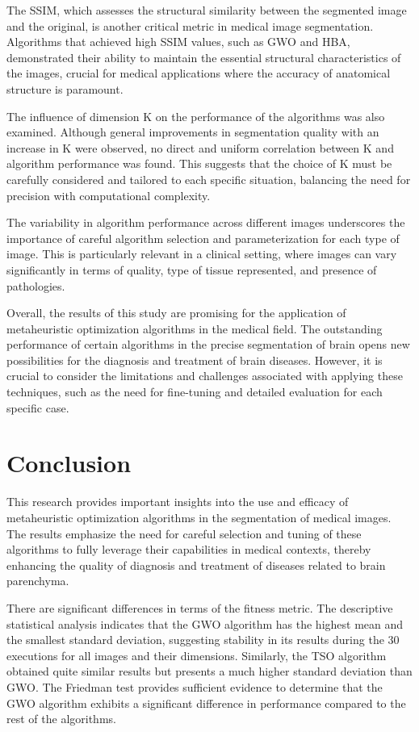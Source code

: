 \documentclass{elsarticle}
\begin{document}
\noindent The SSIM, which assesses the structural similarity between the segmented image and the original, is another critical metric in medical image segmentation. Algorithms that achieved high SSIM values, such as GWO and HBA, demonstrated their ability to maintain the essential structural characteristics of the images, crucial for medical applications where the accuracy of anatomical structure is paramount.

\noindent The influence of dimension K on the performance of the algorithms was also examined. Although general improvements in segmentation quality with an increase in K were observed, no direct and uniform correlation between K and algorithm performance was found. This suggests that the choice of K must be carefully considered and tailored to each specific situation, balancing the need for precision with computational complexity.

\noindent The variability in algorithm performance across different images underscores the importance of careful algorithm selection and parameterization for each type of image. This is particularly relevant in a clinical setting, where images can vary significantly in terms of quality, type of tissue represented, and presence of pathologies.

\noindent Overall, the results of this study are promising for the application of metaheuristic optimization algorithms in the medical field. The outstanding performance of certain algorithms in the precise segmentation of brain opens new possibilities for the diagnosis and treatment of brain diseases. However, it is crucial to consider the limitations and challenges associated with applying these techniques, such as the need for fine-tuning and detailed evaluation for each specific case.

\section{Conclusion} \label{sec:co}

\noindent This research provides important insights into the use and efficacy of metaheuristic optimization algorithms in the segmentation of medical images. The results emphasize the need for careful selection and tuning of these algorithms to fully leverage their capabilities in medical contexts, thereby enhancing the quality of diagnosis and treatment of diseases related to brain parenchyma.

\noindent There are significant differences in terms of the fitness metric. The descriptive statistical analysis indicates that the GWO algorithm has the highest mean and the smallest standard deviation, suggesting stability in its results during the 30 executions for all images and their dimensions. Similarly, the TSO algorithm obtained quite similar results but presents a much higher standard deviation than GWO. The Friedman test provides sufficient evidence to determine that the GWO algorithm exhibits a significant difference in performance compared to the rest of the algorithms.
\end{document}
